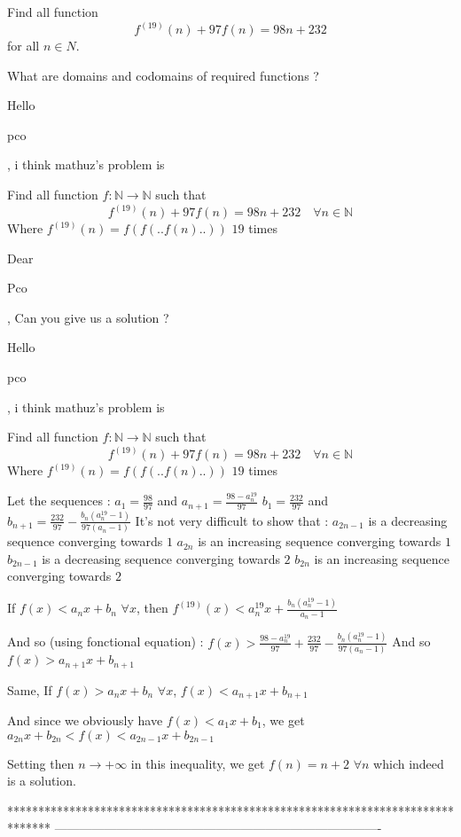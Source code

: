 \begin{solution}
	\begin{tcolorbox}Find all  function  \[ f^{(19)}(n)+97f(n)=98n+232 \]
for all  $ n\in N .$\end{tcolorbox}
What are domains and codomains of required functions ?
\end{solution}



\begin{solution}
	Hello\begin{bolded} pco\end{bolded}, i think mathuz's problem is

Find all  function $f:\mathbb{N}\to\mathbb{N}$ such that \[ f^{(19)}(n)+97f(n)=98n+232  \quad \forall n\in \mathbb{N}\]
Where $ f^{(19)}(n)= f(f(..f(n)..))$  $19$ times 

Dear\begin{bolded} Pco\end{bolded},  Can you give us a solution ?  
\end{solution}



\begin{solution}
	\begin{tcolorbox}Hello\begin{bolded} pco\end{bolded}, i think mathuz's problem is

Find all  function $f:\mathbb{N}\to\mathbb{N}$ such that \[ f^{(19)}(n)+97f(n)=98n+232  \quad \forall n\in \mathbb{N}\]
Where $ f^{(19)}(n)= f(f(..f(n)..))$  $19$ times 
\end{tcolorbox}
Let the sequences :
$a_1=\frac{98}{97}$ and $a_{n+1}=\frac{98-a_n^{19}}{97}$
$b_1=\frac{232}{97}$ and $b_{n+1}=\frac{232}{97}-\frac {b_n(a_n^{19}-1)}{97(a_n-1)}$
It's not very difficult to show that :
$a_{2n-1}$ is a decreasing sequence converging towards $1$
$a_{2n}$ is an increasing sequence converging towards $1$
$b_{2n-1}$ is a decreasing sequence converging towards $2$
$b_{2n}$ is an increasing sequence converging towards $2$

If $f(x)<a_nx+b_n$ $\forall x$, then $f^{(19)}(x)<a_n^{19}x+\frac {b_n(a_n^{19}-1)}{a_n-1}$

And so (using fonctional equation) :  $f(x)>\frac{98-a_n^{19}}{97}+\frac{232}{97}-\frac {b_n(a_n^{19}-1)}{97(a_n-1)}$
And so $f(x)>a_{n+1}x+b_{n+1}$

Same, If $f(x)>a_nx+b_n$ $\forall x$, $f(x)<a_{n+1}x+b_{n+1}$

And since we obviously have $f(x)<a_1x+b_1$, we get $a_{2n}x+b_{2n}<f(x)<a_{2n-1}x+b_{2n-1}$

Setting then $n\to+\infty$ in this inequality, we get $\boxed{f(n)=n+2}$ $\forall n$ which indeed is a solution.
\end{solution}
*******************************************************************************
-------------------------------------------------------------------------------


